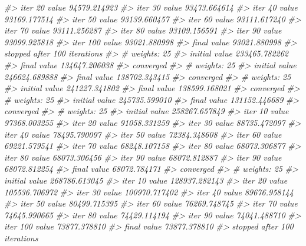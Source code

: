 \documentclass[
  graybox,natbib,nospthms]{svmono}
\newenvironment{Shaded}{\begin{snugshade}}{\end{snugshade}}
\newcommand{\CommentTok}[1]{\textcolor[rgb]{0.37,0.37,0.37}{\textit{#1}}}
\begin{document}
\begin{Shaded}
\begin{Highlighting}[]
\CommentTok{\#\textgreater{} iter  20 value 94579.214923}
\CommentTok{\#\textgreater{} iter  30 value 93473.664614}
\CommentTok{\#\textgreater{} iter  40 value 93169.177514}
\CommentTok{\#\textgreater{} iter  50 value 93139.660457}
\CommentTok{\#\textgreater{} iter  60 value 93111.617240}
\CommentTok{\#\textgreater{} iter  70 value 93111.256287}
\CommentTok{\#\textgreater{} iter  80 value 93109.156591}
\CommentTok{\#\textgreater{} iter  90 value 93099.925818}
\CommentTok{\#\textgreater{} iter 100 value 93021.880998}
\CommentTok{\#\textgreater{} final  value 93021.880998 }
\CommentTok{\#\textgreater{} stopped after 100 iterations}
\CommentTok{\#\textgreater{} \# weights:  25}
\CommentTok{\#\textgreater{} initial  value 233465.782262 }
\CommentTok{\#\textgreater{} final  value 134647.206038 }
\CommentTok{\#\textgreater{} converged}
\CommentTok{\#\textgreater{} \# weights:  25}
\CommentTok{\#\textgreater{} initial  value 246624.689888 }
\CommentTok{\#\textgreater{} final  value 138702.343415 }
\CommentTok{\#\textgreater{} converged}
\CommentTok{\#\textgreater{} \# weights:  25}
\CommentTok{\#\textgreater{} initial  value 241227.341802 }
\CommentTok{\#\textgreater{} final  value 138599.168021 }
\CommentTok{\#\textgreater{} converged}
\CommentTok{\#\textgreater{} \# weights:  25}
\CommentTok{\#\textgreater{} initial  value 245735.599010 }
\CommentTok{\#\textgreater{} final  value 131152.446689 }
\CommentTok{\#\textgreater{} converged}
\CommentTok{\#\textgreater{} \# weights:  25}
\CommentTok{\#\textgreater{} initial  value 258267.657849 }
\CommentTok{\#\textgreater{} iter  10 value 97368.003255}
\CommentTok{\#\textgreater{} iter  20 value 91058.331259}
\CommentTok{\#\textgreater{} iter  30 value 88735.472097}
\CommentTok{\#\textgreater{} iter  40 value 78495.790097}
\CommentTok{\#\textgreater{} iter  50 value 72384.348608}
\CommentTok{\#\textgreater{} iter  60 value 69221.579541}
\CommentTok{\#\textgreater{} iter  70 value 68248.107158}
\CommentTok{\#\textgreater{} iter  80 value 68073.306877}
\CommentTok{\#\textgreater{} iter  80 value 68073.306456}
\CommentTok{\#\textgreater{} iter  90 value 68072.812887}
\CommentTok{\#\textgreater{} iter  90 value 68072.812254}
\CommentTok{\#\textgreater{} final  value 68072.784171 }
\CommentTok{\#\textgreater{} converged}
\CommentTok{\#\textgreater{} \# weights:  25}
\CommentTok{\#\textgreater{} initial  value 268786.613045 }
\CommentTok{\#\textgreater{} iter  10 value 128937.282143}
\CommentTok{\#\textgreater{} iter  20 value 105536.706972}
\CommentTok{\#\textgreater{} iter  30 value 100970.717402}
\CommentTok{\#\textgreater{} iter  40 value 89676.958144}
\CommentTok{\#\textgreater{} iter  50 value 80499.715395}
\CommentTok{\#\textgreater{} iter  60 value 76269.748745}
\CommentTok{\#\textgreater{} iter  70 value 74645.990665}
\CommentTok{\#\textgreater{} iter  80 value 74429.114194}
\CommentTok{\#\textgreater{} iter  90 value 74041.488710}
\CommentTok{\#\textgreater{} iter 100 value 73877.378810}
\CommentTok{\#\textgreater{} final  value 73877.378810 }
\CommentTok{\#\textgreater{} stopped after 100 iterations}
\end{Highlighting}
\end{Shaded}
\end{document}
